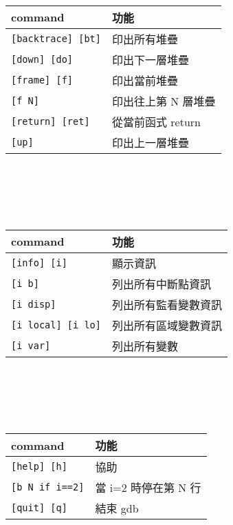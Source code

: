 \begin{center}
     \\
    \begin{tabular}{|p{2.7cm}|p{2.7cm}|}
        \hline
        command                         & 功能 \\
        \hline
        \verb|[backtrace] [bt]|         & 印出所有堆疊 \\
        \verb|[down] [do]|              & 印出下一層堆疊 \\
        \verb|[frame] [f]|              & 印出當前堆疊 \\
        \verb|[f N]|                    & 印出往上第 N 層堆疊 \\
        \verb|[return] [ret]|           & 從當前函式 return \\
        \verb|[up]|                     & 印出上一層堆疊 \\
        \hline
    \end{tabular} \\
    \hspace{\fill} \\
    \hspace{\fill} \\

     \\
    \begin{tabular}{|p{2.7cm}|p{2.7cm}|}
        \hline
        command                         & 功能 \\
        \hline
        \verb|[info] [i]|               & 顯示資訊 \\
        \verb|[i b]|                    & 列出所有中斷點資訊 \\
        \verb|[i disp]|                 & 列出所有監看變數資訊 \\
        \verb|[i local] [i lo]|         & 列出所有區域變數資訊 \\
        \verb|[i var]|                  & 列出所有變數 \\
        \hline
    \end{tabular} \\
    \hspace{\fill} \\
    \hspace{\fill} \\

     \\
    \begin{tabular}{|p{2.7cm}|p{2.7cm}|}
        \hline
        command                         & 功能 \\
        \hline
        \verb|[help] [h]|               & 協助 \\
        \verb|[b N if i==2]|            & 當 i=2 時停在第 N 行 \\
        \verb|[quit] [q]|               & 結束 gdb \\
        \hline
    \end{tabular} \\
    \hspace{\fill} \\
    \hspace{\fill} \\


\end{center}
